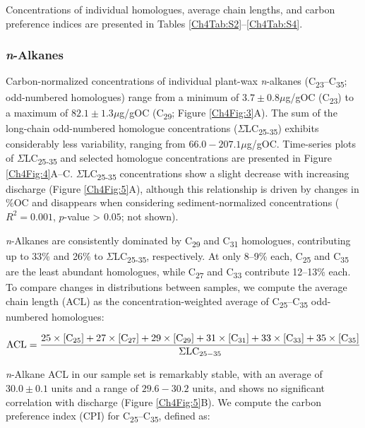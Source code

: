Concentrations of individual homologues, average chain lengths, and carbon preference indices are presented in Tables \ref{Ch4Tab:S2}--\ref{Ch4Tab:S4}.

\subsubsection{\textit{n}-Alkanes}

Carbon-normalized concentrations of individual plant-wax \textit{n}-alkanes (C\textsubscript{23}--C\textsubscript{35}; odd-numbered homologues) range from a minimum of $3.7 \pm 0.8 \mu$g/gOC (C\textsubscript{23}) to a maximum of $82.1 \pm 1.3 \mu$g/gOC (C\textsubscript{29}; Figure \ref{Ch4Fig:3}A). The sum of the long-chain odd-numbered homologue concentrations ($\Sigma$LC\textsubscript{25-35}) exhibits considerably less variability, ranging from $66.0 - 207.1 \mu$g/gOC. Time-series plots of $\Sigma$LC\textsubscript{25-35} and selected homologue concentrations are presented in Figure \ref{Ch4Fig:4}A--C. $\Sigma$LC\textsubscript{25-35} concentrations show a slight decrease with increasing discharge (Figure \ref{Ch4Fig:5}A), although this relationship is driven by changes in \%OC and disappears when considering sediment-normalized concentrations ($R^2 = 0.001$, $p$-value > $0.05$; not shown).

\textit{n}-Alkanes are consistently dominated by C\textsubscript{29} and C\textsubscript{31} homologues, contributing up to 33\% and 26\% to $\Sigma$LC\textsubscript{25-35}, respectively. At only 8--9\% each, C\textsubscript{25} and C\textsubscript{35} are the least abundant homologues, while C\textsubscript{27} and C\textsubscript{33} contribute 12--13\% each. To compare changes in distributions between samples, we compute the average chain length (ACL) as the concentration-weighted average of C\textsubscript{25}--C\textsubscript{35} odd-numbered homologues:

\begin{equation}\label{Ch4Eq:1}
\text{ACL} = \frac{25\times[\ce{C}_{25}] + 27\times[\ce{C}_{27}] + 29\times[\ce{C}_{29}] + 31\times[\ce{C}_{31}] + 33\times[\ce{C}_{33}] + 35\times[\ce{C}_{35}]}{\Sigma \text{LC}_{25-35}}
\end{equation}

\textit{n}-Alkane ACL in our sample set is remarkably stable, with an average of $30.0 \pm 0.1$ units and a range of $29.6 - 30.2$ units, and shows no significant correlation with discharge (Figure \ref{Ch4Fig:5}B). We compute the carbon preference index (CPI) for C\textsubscript{25}--C\textsubscript{35}, defined as: 

